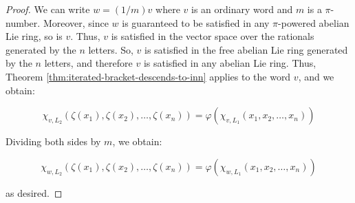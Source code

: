 \begin{proof}
  We can write $w = (1/m)v$ where $v$ is an ordinary word and $m$ is a
  $\pi$-number. Moreover, since $w$ is guaranteed to be satisfied in
  any $\pi$-powered abelian Lie ring, so is $v$. Thus, $v$ is
  satisfied in the vector space over the rationals generated by the
  $n$ letters. So, $v$ is satisfied in the free abelian Lie ring
  generated by the $n$ letters, and therefore $v$ is satisfied in any
  abelian Lie ring. Thus, Theorem
  \ref{thm:iterated-bracket-descends-to-inn} applies to the word
  $v$, and we obtain:

  $$\chi_{v,L_2}(\zeta(x_1),\zeta(x_2),\dots,\zeta(x_n)) = \varphi(\chi_{v,L_1}(x_1,x_2,\dots,x_n))$$

  Dividing both sides by $m$, we obtain:

  $$\chi_{w,L_2}(\zeta(x_1),\zeta(x_2),\dots,\zeta(x_n)) = \varphi(\chi_{w,L_1}(x_1,x_2,\dots,x_n))$$

  as desired.
\end{proof}
